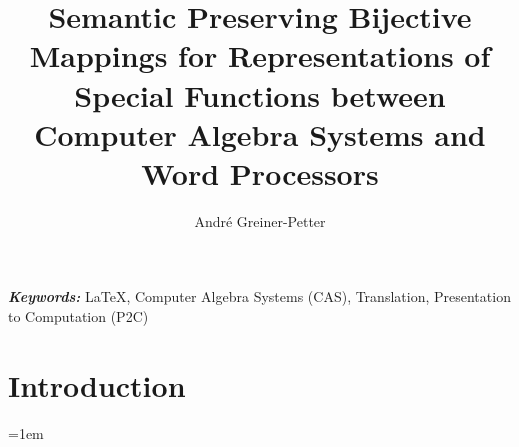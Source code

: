 \documentclass[a4paper,11pt]{article}
\title{
    Semantic Preserving Bijective Mappings for Representations of Special Functions between Computer Algebra Systems and Word Processors
}
\author{Andr\'e Greiner-Petter}
\affil{
	Information Science Group, University of Konstanz, Germany\\
	\url{andre.greiner-petter@t-online.de}
}
\date{} %
\begin{document}
\maketitle

\glsresetall

\noindent
{\it \bf Keywords:} LaTeX, Computer Algebra Systems (CAS), Translation, Presentation to Computation (P2C)



\section{Introduction}


%

%
%

%
%
%
%







%

%
%

\emergencystretch=1em
\printbibliography
\end{document}
